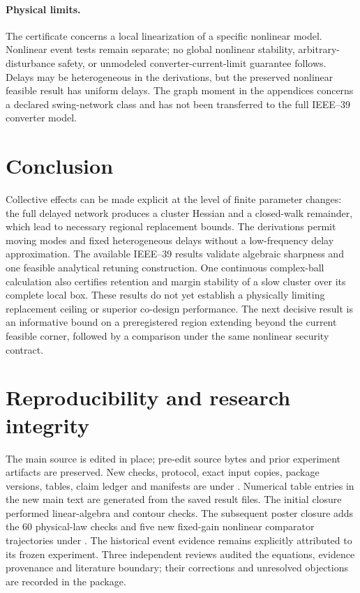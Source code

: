 \documentclass[11pt]{article}
\begin{document}
\paragraph{Physical limits.}
The certificate concerns a local linearization of a specific
nonlinear model. Nonlinear event tests remain separate; no global
nonlinear stability, arbitrary-disturbance safety, or unmodeled
converter-current-limit guarantee follows. Delays may be
heterogeneous in the derivations, but the preserved nonlinear
feasible result has uniform delays. The graph moment in the
appendices concerns a declared swing-network class and has not
been transferred to the full IEEE--39 converter model.

\section{Conclusion}
Collective effects can be made explicit at the level of finite
parameter changes: the full delayed network produces a cluster
Hessian and a closed-walk remainder, which lead to necessary
regional replacement bounds. The derivations permit moving modes
and fixed heterogeneous delays without a low-frequency delay
approximation. The available IEEE--39 results validate algebraic
sharpness and one feasible analytical retuning construction.
One continuous complex-ball calculation also certifies retention and
margin stability of a slow cluster over its complete local box.
These results do not yet establish a physically limiting replacement ceiling
or superior co-design performance. The next decisive result is an
informative bound on a preregistered region extending beyond the
current feasible corner, followed by a comparison under the same
nonlinear security contract.

\section*{Reproducibility and research integrity}
The main source is edited in place; pre-edit source bytes and prior
experiment artifacts are preserved. New checks, protocol, exact
input copies, package versions, tables, claim ledger and manifests
are under .
Numerical table entries in the new main text are generated from
the saved result files. The initial closure performed linear-algebra
and contour checks. The subsequent poster closure adds the 60 physical-law
checks and five new fixed-gain nonlinear comparator trajectories under
.
The historical event evidence remains explicitly attributed to its
frozen experiment. Three independent reviews audited the equations,
evidence provenance and literature boundary; their corrections and
unresolved objections are recorded in the package.
\end{document}
